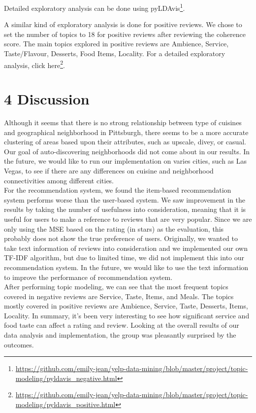 \documentclass{neu_handout}
\begin{document}
Detailed exploratory analysis can be done using pyLDAvis\footnote{\url{https://github.com/emily-jean/yelp-data-mining/blob/master/project/topic-modeling/pyldavis_negative.html}}.

A similar kind of exploratory analysis is done for positive reviews. We chose to set the number of topics to 18 for positive reviews after reviewing the coherence score. The main topics explored in positive reviews are Ambience, Service, Taste/Flavour, Desserts, Food Items, Locality. For a detailed exploratory analysis, click here\footnote{\url{https://github.com/emily-jean/yelp-data-mining/blob/master/project/topic-modeling/pyldavis_positive.html}}.


\section*{4 Discussion}

Although it seems that there is no strong relationship between type of cuisines and geographical neighborhood in Pittsburgh, there seems to be a more accurate clustering of areas based upon their attributes, such as upscale, divey, or casual. Our goal of auto-discovering neighborhoods did not come about in our results. In the future, we would like to run our implementation on varies cities, such as Las Vegas, to see if there are any differences on
cuisine and neighborhood connectivities among different cities.\\

For the recommendation system, we found the item-based recommendation system performs worse than the user-based system. We saw improvement in the results by taking the number of usefulness into consideration, meaning that it is useful for users to make a reference to reviews that are very popular. Since we are only using the MSE based on the rating (in stars) as the evaluation, this probably does not show the true preference of users. Originally, we wanted to take text information of reviews into consideration and we implemented our own TF-IDF algorithm, but due to limited time, we did not implement this into our recommendation system. In the future, we would like to use the text information to improve the performance of recommendation system.\\

After performing topic modeling, we can see that the most frequent topics covered in negative reviews are Service, Taste, Items, and Meals. The topics mostly covered in positive reviews are Ambience, Service, Taste, Desserts, Items, Locality. In summary, it's been very interesting to see how significant service and food taste can affect a rating and review. Looking at the overall results of our data analysis and implementation, the group was pleasantly surprised by the
outcomes.\\
\end{document}
